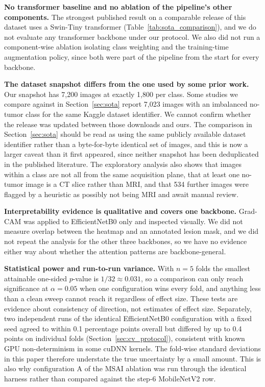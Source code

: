 \documentclass[11pt]{article}
\begin{document}
\textbf{No transformer baseline and no ablation of the pipeline's other components.} The strongest published result on a comparable release of this dataset uses a Swin-Tiny transformer (Table~\ref{tab:sota_comparison}), and we do not evaluate any transformer backbone under our protocol. We also did not run a component-wise ablation isolating class weighting and the training-time augmentation policy, since both were part of the pipeline from the start for every backbone.

\textbf{The dataset snapshot differs from the one used by some prior work.} Our snapshot has 7,200 images at exactly 1,800 per class. Some studies we compare against in Section~\ref{sec:sota} report 7,023 images with an imbalanced no-tumor class for the same Kaggle dataset identifier. We cannot confirm whether the release was updated between those downloads and ours. The comparison in Section~\ref{sec:sota} should be read as using the same publicly available dataset identifier rather than a byte-for-byte identical set of images, and this is now a larger caveat than it first appeared, since neither snapshot has been deduplicated in the published literature. The exploratory analysis also shows that images within a class are not all from the same acquisition plane, that at least one no-tumor image is a CT slice rather than MRI, and that 534 further images were flagged by a heuristic as possibly not being MRI and await manual review.

\textbf{Interpretability evidence is qualitative and covers one backbone.} Grad-CAM was applied to EfficientNetB0 only and inspected visually. We did not measure overlap between the heatmap and an annotated lesion mask, and we did not repeat the analysis for the other three backbones, so we have no evidence either way about whether the attention patterns are backbone-general.

\textbf{Statistical power and run-to-run variance.} With $n=5$ folds the smallest attainable one-sided $p$-value is $1/32 \approx 0.031$, so a comparison can only reach significance at $\alpha=0.05$ when one configuration wins every fold, and anything less than a clean sweep cannot reach it regardless of effect size. These tests are evidence about consistency of direction, not estimates of effect size. Separately, two independent runs of the identical EfficientNetB0 configuration with a fixed seed agreed to within 0.1 percentage points overall but differed by up to 0.4 points on individual folds (Section~\ref{sec:cv_protocol}), consistent with known GPU non-determinism in some cuDNN kernels. The fold-wise standard deviations in this paper therefore understate the true uncertainty by a small amount. This is also why configuration A of the MSAI ablation was run through the identical harness rather than compared against the step-6 MobileNetV2 row.
\end{document}
